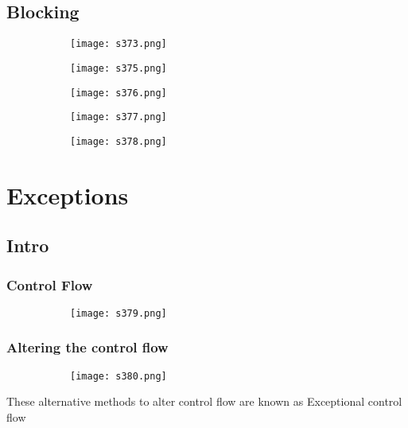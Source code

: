 \documentclass[8pt]{extreport}
\begin{document}
\section{Blocking}

\begin{figure}[H]
\begin{subfigure}[b]{0.4\linewidth}
\texttt{[image: s373.png]}
\end{subfigure}
\begin{subfigure}[b]{0.4\linewidth}
\texttt{[image: s375.png]}
\end{subfigure}
\begin{subfigure}[b]{0.4\linewidth}
\texttt{[image: s376.png]}
\end{subfigure}
\begin{subfigure}[b]{0.4\linewidth}
\texttt{[image: s377.png]}
\end{subfigure}
\begin{subfigure}[b]{0.4\linewidth}
\texttt{[image: s378.png]}
\end{subfigure}
\end{figure}


\chapter{Exceptions}

\section{Intro}

\subsection{Control Flow}
\begin{figure}[H]
\begin{subfigure}[b]{0.4\linewidth}
\texttt{[image: s379.png]}
\end{subfigure}
\end{figure}

\subsection{Altering the control flow}
\begin{figure}[H]
\begin{subfigure}[b]{0.4\linewidth}
\texttt{[image: s380.png]}
\end{subfigure}
\end{figure}
These alternative methods to alter control flow are known as Exceptional control flow
\end{document}
